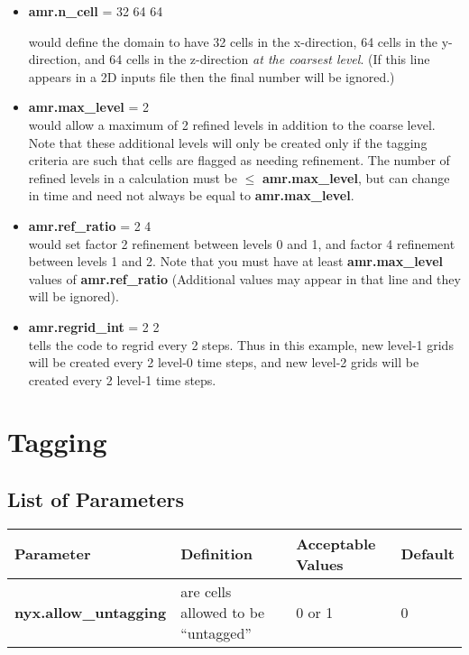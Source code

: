 \begin{itemize}

\item {\bf amr.n\_cell} = 32 64 64

would define the domain to have 32 cells in the x-direction, 64 cells in the y-direction, 
and 64 cells in the z-direction {\em{at the coarsest level}}. 
(If this line appears in a 2D inputs file then the final number will be ignored.)

\item {\bf amr.max\_level} = 2 \\ 
would allow a maximum  of 2 refined levels in addition to the coarse level.   
Note that these additional levels will only be created only if the tagging criteria 
are such that cells are flagged as needing refinement.  The number of refined levels 
in a calculation must be $\leq$ {\bf amr.max\_level}, but can change in time and need
not always be equal to {\bf amr.max\_level}.
 
\item {\bf amr.ref\_ratio} = 2 4 \\ 
would set factor 2 refinement between levels 0 and 1, and factor 4 refinement between levels 1 and 2. 
Note that you must have at least {\bf amr.max\_level} values of {\bf amr.ref\_ratio} 
(Additional values may appear in that line and they will be ignored).

\item {\bf amr.regrid\_int} = 2 2 \\
tells the code to regrid every 2 steps.  Thus in this example, new level-1 grids will be created every 2 level-0 time steps, and
new level-2 grids will be created every 2 level-1 time steps.

\end{itemize}

\section{Tagging}

\subsection{List of Parameters}

\begin{table*}[h]
\begin{scriptsize}
\begin{center}
\begin{tabular}{|l|l|l|l|} \hline
Parameter & Definition & Acceptable Values &Default\\
\hline
{\bf nyx.allow\_untagging} & are cells allowed to be ``untagged'' & 0 or 1 & 0 \\
\hline
\end{tabular}
\label{Table:Tagging}
\end{center}
\end{scriptsize}
\end{table*}

